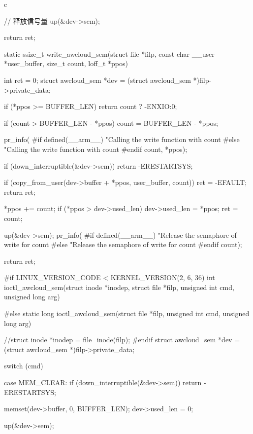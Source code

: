 \begin{code-block}{c}
{        // 释放信号量
        up(&dev->sem);

        return ret;
}

static ssize_t write_awcloud_sem(struct file *filp,
        const char __user *user_buffer, size_t count, loff_t *ppos)
{
        int ret = 0;
        struct awcloud_sem *dev = (struct awcloud_sem *)filp->private_data;

        if (*ppos >= BUFFER_LEN) {
                return count ? -ENXIO:0;
        }

        if (count > BUFFER_LEN - *ppos) {
                count = BUFFER_LEN - *ppos;
        }

        pr_info(
#if defined(__arm__)
                "Calling the write function with count %
#else
                "Calling the write function with count %
#endif
                count, *ppos);

        if (down_interruptible(&dev->sem)) {
                return -ERESTARTSYS;
        }

        if (copy_from_user(dev->buffer + *ppos, user_buffer, count)) {
                ret = -EFAULT;
                return ret;
        }

        *ppos += count;
        if (*ppos > dev->used_len) {
                dev->used_len = *ppos;
        }
        ret = count;

        up(&dev->sem);
        pr_info(
#if defined(__arm__)
                "Release the semaphore of write for count %
#else
                "Release the semaphore of write for count %
#endif
                count);

        return ret;
}

#if LINUX_VERSION_CODE < KERNEL_VERSION(2, 6, 36)
int ioctl_awcloud_sem(struct inode *inodep,
        struct file *filp, unsigned int cmd, unsigned long arg)
{
#else
static long ioctl_awcloud_sem(struct file *filp,
        unsigned int cmd, unsigned long arg)
{
        //struct inode *inodep = file_inode(filp);
#endif
        struct awcloud_sem *dev = (struct awcloud_sem *)filp->private_data;

        switch (cmd) {
        case MEM_CLEAR:
                if (down_interruptible(&dev->sem)) {
                        return -ERESTARTSYS;
                }

                memset(dev->buffer, 0, BUFFER_LEN);
                dev->used_len = 0;

                up(&dev->sem);

}}}
\end{code-block}
